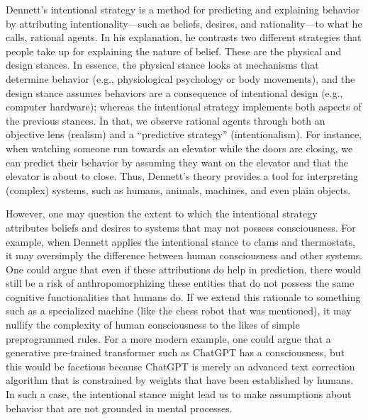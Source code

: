\documentclass[11pt]{article}
\begin{document}
Dennett's intentional strategy is a method for predicting and explaining behavior by attributing intentionality—such as beliefs, desires, and rationality—to what he calls, rational agents. In his explanation, he contrasts two different strategies that people take up for explaining the nature of belief. These are the physical and design stances. In essence, the physical stance looks at mechanisms that determine behavior (e.g., physiological psychology or body movements), and the design stance assumes behaviors are a consequence of intentional design (e.g., computer hardware); whereas the intentional strategy implements both aspects of the previous stances. In that, we observe rational agents through both an objective lens (realism) and a ``predictive strategy'' (intentionalism). For instance, when watching someone run towards an elevator while the doors are closing, we can predict their behavior by assuming they want on the elevator and that the elevator is about to close. Thus, Dennett's theory provides a tool for interpreting (complex) systems, such as humans, animals, machines, and even plain objects. 

However, one may question the extent to which the intentional strategy attributes beliefs and desires to systems that may not possess consciousness. For example, when Dennett applies the intentional stance to clams and thermostats, it may oversimply the difference between human consciousness and other systems. One could argue that even if these attributions do help in prediction, there would still be a risk of anthropomorphizing these entities that do not possess the same cognitive functionalities that humans do. If we extend this rationale to something such as a specialized machine (like the chess robot that was mentioned), it may nullify the complexity of human consciousness to the likes of simple preprogrammed rules. For a more modern example, one could argue that a generative pre-trained transformer such as ChatGPT has a consciousness, but this would be facetious because ChatGPT is merely an advanced text correction algorithm that is constrained by weights that have been established by humans. In such a case, the intentional stance might lead us to make assumptions about behavior that are not grounded in mental processes.
\end{document}
